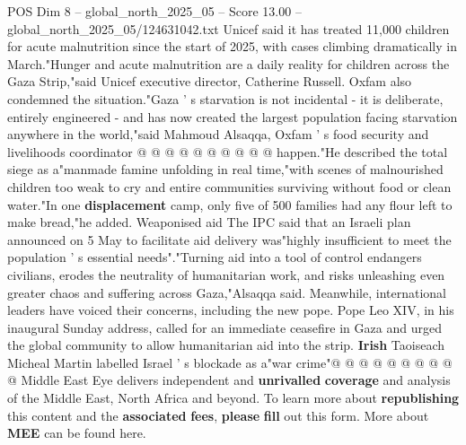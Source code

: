 \begin{textsample}{POS Dim 8 – global\_north\_2025\_05 – Score 13.00 – global\_north\_2025\_05/124631042.txt}
Unicef said it has treated 11,000 children for acute malnutrition since the start of 2025, with cases climbing dramatically in March."Hunger and acute malnutrition are a daily reality for children across the Gaza Strip,"said Unicef executive director, Catherine Russell.
Oxfam also condemned the situation."Gaza ' s starvation is not incidental - it is deliberate, entirely engineered - and has now created the largest population facing starvation anywhere in the world,"said Mahmoud Alsaqqa, Oxfam ' s food security and livelihoods coordinator @ @ @ @ @ @ @ @ @ @ happen."He described the total siege as a"manmade famine unfolding in real time,"with scenes of malnourished children too weak to cry and entire communities surviving without food or clean water."In one \textbf{displacement} camp, only five of 500 families had any flour left to make bread,"he added.
Weaponised aid The IPC said that an Israeli plan announced on 5 May to facilitate aid delivery was"highly insufficient to meet the population ' s essential needs"."Turning aid into a tool of control endangers civilians, erodes the neutrality of humanitarian work, and risks unleashing even greater chaos and suffering across Gaza,"Alsaqqa said.
Meanwhile, international leaders have voiced their concerns, including the new pope.
Pope Leo XIV, in his inaugural Sunday address, called for an immediate ceasefire in Gaza and urged the global community to allow humanitarian aid into the strip. \textbf{Irish} Taoiseach Micheal Martin labelled Israel ' s blockade as a"war crime"@ @ @ @ @ @ @ @ @ @ Middle East Eye delivers independent and \textbf{unrivalled} \textbf{coverage} and analysis of the Middle East, North Africa and beyond.
To learn more about \textbf{republishing} this content and the \textbf{associated} \textbf{fees}, \textbf{please} \textbf{fill} out this form.
More about \textbf{MEE} can be found here.

\end{textsample}
